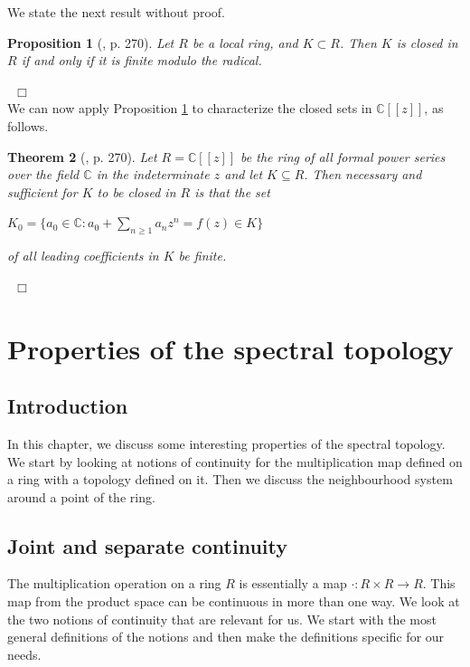 \documentclass[12pt, oneside]{book}
\newtheorem{theorem}{Theorem}[subsection]
\newtheorem{proposition}[theorem]{Proposition}
\newcommand{\qed}{\hfill ~$\Box$\\}
\begin{document}
 \vskip 0.3cm
\noindent We state the next result without proof.
\begin{proposition}[\cite{CH3}, p. 270] \label{finiteModuloTheRadical}
\normalfont
\noindent Let $R$ be a local ring, and $K \subset R$. Then $K$ is closed in $R$ if and only if 
it is finite modulo the radical.
\end{proposition}
\qed
\vskip 0.3cm
\noindent We can now apply Proposition \ref{finiteModuloTheRadical} to characterize the 
closed sets in 
$\mathbb{C}[[z]]$, as follows.
\begin{theorem}[\cite{CH3}, p. 270]
\normalfont
\noindent Let $R= \mathbb{C}[[z]]$ be the ring of all formal power series over the field $\mathbb{C}$ in
 the indeterminate $z$ and let $K \subseteq R$. Then necessary and sufficient for $K$ to be closed in $R$ is that the set 
\begin{center} 
 $K_0=\{ a_0 \in \mathbb{C}: a_0 + \sum_{n \geq 1} a_n z^n=f(z) \in K \}$ 
\end{center} 
 of all leading coefficients in $K$ be finite.
\end{theorem}
\qed
\vskip 1cm
\begin{center}
\maltese
\end{center}

\chapter{Properties of the spectral topology}

\section{Introduction}

In this chapter, we discuss some interesting properties of the spectral topology. We start by looking
at notions of continuity for the multiplication map defined on a ring with a topology defined on it. Then
we discuss the neighbourhood system around a point of the ring.

\section{Joint and separate continuity}

\noindent The multiplication operation on a ring $R$ is essentially a map 
$\cdot : R \times R \rightarrow R$. This map from the product space can be continuous in more than one 
way. We look at the two notions of continuity that are relevant for us. We start with the most general
definitions of the notions and then make the definitions specific for our needs. 
\end{document}
